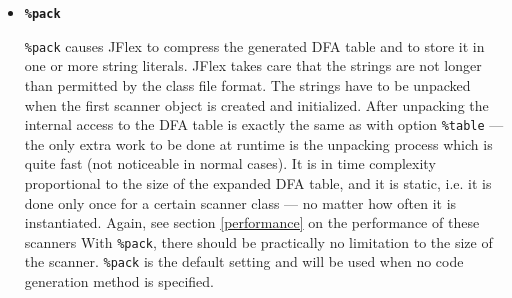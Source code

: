 \documentclass[11pt]{scrartcl}
\begin{document}
\begin{itemize}
\item
  {\bf \texttt{\%pack}}
  
  \texttt{\%pack} causes JFlex to compress the generated DFA table and to
  store it in one or more string literals. JFlex takes care that the
  strings are not longer than permitted by the class file format.
  The strings have to be unpacked when
  the first scanner object is created and initialized.
  After unpacking the internal access to the DFA table is exactly the
  same as with option \texttt{\%table} --- the only extra work to be done
  at runtime is the unpacking process which is quite fast (not noticeable
  in normal cases). It is in time complexity proportional to the
  size of the expanded DFA table, and it is static,
  i.e. it is done only once for a certain scanner class --- no matter
  how often it is instantiated.  Again, see section
  \ref{performance} 
  on the performance of these scanners
  With \texttt{\%pack}, there should be practically no
  limitation to the size of the scanner. \texttt{\%pack} is the default
  setting and will be used when no code generation method is specified.
\end{itemize}
\end{document}

